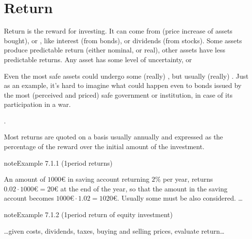\documentclass[letterpaper,10pt,english]{jupyterBook}
\begin{document}
\section{Return}
\label{\detokenize{ch/principles/intro_nb:return}}\label{\detokenize{ch/principles/intro_nb:fin-edu-principles-return}}
\sphinxAtStartPar
Return is the reward for investing. It can come from  (price increase of assets bought), or , like interest (from bonds), or dividends (from stocks). Some assets produce predictable return (either nominal, or real), other assets have less predictable returns. Any asset has some level of uncertainty, or {\hyperref[\detokenize{ch/principles/intro_nb:fin-edu-principles-rr}]{}}%
\begin{footnote}[1]\sphinxAtStartFootnote
Even the most safe assets could undergo some (really) , but usually (really) . Just as an example, it’s hard to imagine what could happen even to bonds issued by the most (perceived and priced) safe government or institution, in case of its participation in a war.
%
\end{footnote}.

\sphinxAtStartPar
Most returns are quoted on a  basis \sphinxhyphen{} usually annually \sphinxhyphen{} and expressed as the percentage of the reward over the initial amount of the investment.
\label{ch/principles/intro_nb:example-0}
\begin{sphinxadmonition}{note}{Example 7.1.1 (1\sphinxhyphen{}period returns)}



\sphinxAtStartPar
An amount of \(1000\)€ in saving account returning \(2\%\) per year, returns \(0.02 \cdot 1000\text{€} = 20\)€ at the end of the year, so that the amount in the saving account becomes \(1000\text{€} \cdot 1.02 = 1020\text{€}\). Usually some {\hyperref[\detokenize{ch/principles/intro_nb:fin-edu-principles-return-costs}]{}} must be also considered.
…
\end{sphinxadmonition}
\label{ch/principles/intro_nb:example-1}
\begin{sphinxadmonition}{note}{Example 7.1.2 (1\sphinxhyphen{}period return of equity investment)}



\sphinxAtStartPar
…given costs, dividends, taxes, buying and selling prices, evaluate return…
\end{sphinxadmonition}
\end{document}

